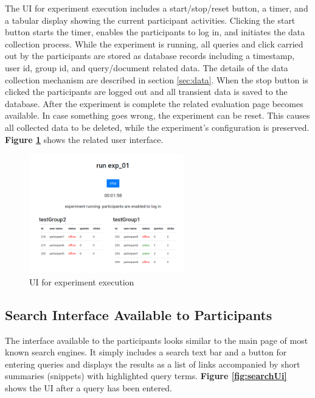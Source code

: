 \documentclass[a4paper]{usiinfbachelorproject}
\begin{document}
The UI for experiment execution includes a start/stop/reset button, a timer, and a tabular display 
showing the current participant activities. Clicking the start button starts the timer, enables the participants to log in, and
initiates the data collection process. While the experiment is running, all queries and click carried out by the
participants are stored as database records including a timestamp, user id, group id, and query/document related data.
The details of the data collection mechanism are described in section \ref{sec:data}.
When the stop button is clicked the participants are logged out and all transient data is saved to the database.
After the experiment is complete the related evaluation page becomes available.
In case something goes wrong, the experiment can be reset. This causes all collected data to be deleted, while the
experiment's configuration is preserved.
\textbf{Figure \ref{fig:run}} shows the related user interface.

\begin{figure} [h]
\centering
\includegraphics[width=0.6\textwidth]{figures/run}
\caption{UI for experiment execution}
\label{fig:run}
\end{figure}

\subsection{\textbf{Search Interface Available to Participants}} \label{sec:designSearchUi}

The interface available to the participants looks similar to the main page of most known search engines. It simply
includes a search text bar and a button for entering queries and displays the results as a list of
links accompanied by short summaries (snippets) with highlighted query terms. 
\textbf{Figure \ref{fig:searchUi}} shows the UI after a query has been entered.
\end{document}
